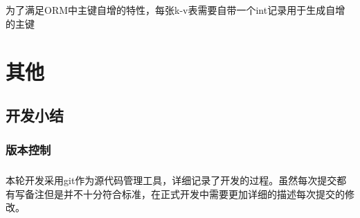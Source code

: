 \documentclass[notitlepage,cs4size,punct,oneside]{report}
\begin{document}
\begin{CJK}{UTF8}{hei}
\paragraph{}为了满足ORM中主键自增的特性，每张k-v表需要自带一个int记录用于生成自增的主键

\chapter{其他}
\section{开发小结}
\subsection{版本控制}
\paragraph{}本轮开发采用git作为源代码管理工具，详细记录了开发的过程。虽然每次提交都有写备注但是并不十分符合标准，在正式开发中需要更加详细的描述每次提交的修改。

\pagebreak
\end{CJK}
\end{document}
